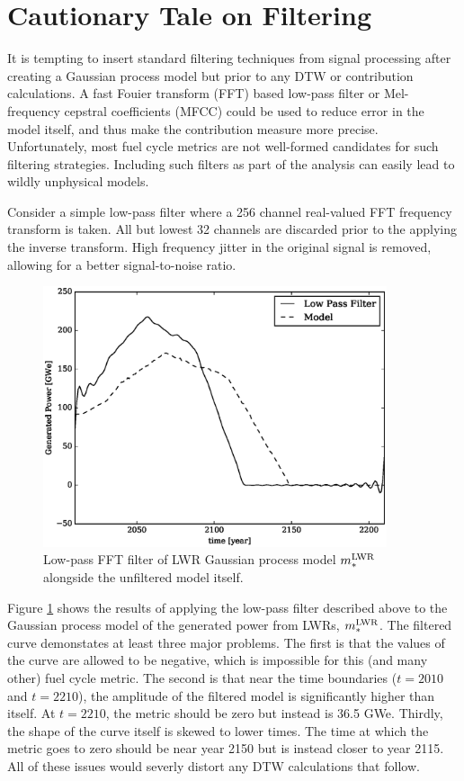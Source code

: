 \clearpage
\section{Cautionary Tale on Filtering}
\label{filtering}

It is tempting to insert standard filtering techniques from signal processing 
after creating a Gaussian process model but prior to any DTW or contribution 
calculations. A fast Fouier transform (FFT) \citeme based low-pass filter or 
Mel-frequency cepstral coefficients (MFCC) \citeme could be used to reduce error 
in the model itself, 
and thus make the contribution measure more precise. Unfortunately, most 
fuel cycle metrics are not well-formed candidates for such filtering strategies.
Including such filters as part of the analysis can easily lead to wildly unphysical
models.

Consider a simple low-pass filter where a 256 channel real-valued FFT frequency 
transform is taken.  All but lowest 32 channels are discarded prior to the applying 
the inverse transform. High frequency jitter in the original signal is removed, 
allowing for a better signal-to-noise ratio.

\begin{figure}[htb]
\centering
\includegraphics[width=0.9\textwidth]{fft-lwr-model.eps}
\caption{Low-pass FFT filter of LWR Gaussian process model $m_*^{\mathrm{LWR}}$ alongside
the unfiltered model itself.}
\label{fft-lwr-model}
\end{figure}

Figure \ref{fft-lwr-model} shows the results of applying the low-pass filter 
described above to the Gaussian process model of the generated power from LWRs, 
$m_*^{\mathrm{LWR}}$.  The filtered curve demonstates at least three major problems.  The
first is that the values of the curve are allowed to be negative, which is 
impossible for this (and many other) fuel cycle metric.  The second is that 
near the time boundaries ($t=2010$ and $t=2210$), the amplitude of the filtered model
is significantly higher than itself. At $t=2210$, the metric should be zero but
instead is 36.5 GWe. Thirdly, the shape of the curve itself is skewed to lower 
times. The time at which the metric goes to zero should be near year 2150 but is 
instead closer to year 2115.  All of these issues would severly distort any 
DTW calculations that follow.


